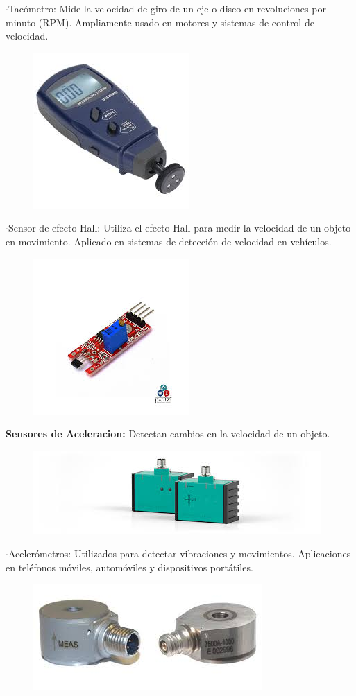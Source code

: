 	$\cdot$Tacómetro: Mide la velocidad de giro de un eje o disco en revoluciones por minuto (RPM). Ampliamente usado en motores y sistemas de control de velocidad.


\begin{figure} [h]
	\centering
	\includegraphics[width=0.3\linewidth]{img/tacometro}
	\caption{}
	\label{fig:tacometro}
\end{figure}


	$\cdot$Sensor de efecto Hall: Utiliza el efecto Hall para medir la velocidad de un objeto en movimiento. Aplicado en sistemas de detección de velocidad en vehículos.


\begin{figure} [h]
	\centering
	\includegraphics[width=0.3\linewidth]{img/sensorhall}
	\caption{}
	\label{fig:sensorhall}
\end{figure}

\newpage
\textbf{Sensores de Aceleracion:}
	Detectan cambios en la velocidad de un objeto.

\begin{figure} [h]
	\centering
	\includegraphics[width=0.3\linewidth]{img/sensoraceleracion}
	\caption{}
	\label{fig:sensoraceleracion}
\end{figure}


	$\cdot$Acelerómetros: Utilizados para detectar vibraciones y movimientos. Aplicaciones en teléfonos móviles, automóviles y dispositivos portátiles.


\begin{figure} [h]
	\centering
	\includegraphics[width=0.3\linewidth]{img/acelerometrosensor}
	\caption{}
	\label{fig:acelerometrosensor}
\end{figure}


